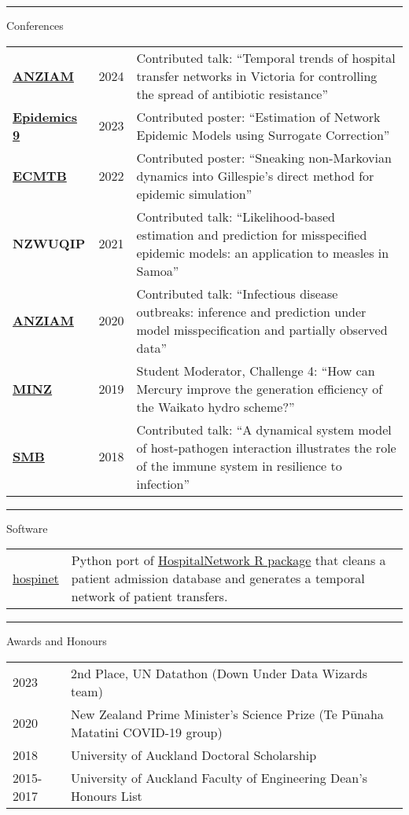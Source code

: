 \documentclass[paper=a4paper,fontsize=11pt]{scrartcl}
\newcommand{\pagerule}[1][2pt]{\noindent\rule{\textwidth}{#1}}
\newcommand{\usingfont}[2]{#1 #2 \par \normalsize \normalfont}
\newcommand{\sectionheader}[1]{\pagerule \vspace{0.05ex} \usingfont{\usefont{T1}{phv}{m}{v} \Large}{\noindent \hspace{-0.5em} #1} \vspace{0.75ex}}
\newlength{\spacebox}
\begin{document}
\sectionheader{Conferences}
\vspace{0.5ex}
\noindent 
\begin{tabular}{p{1.1\spacebox} p{0.5\spacebox} p{6.7\spacebox}}
\href{https://www.mathematics.org.au/sys/pages/plain.php?page\_id=39\&conf\_id=61}{\textbf{ANZIAM}} & 2024 & Contributed
talk: ``Temporal trends of hospital transfer networks in Victoria for
controlling the spread of antibiotic resistance'' \\
\href{https://www.elsevier.com/events/conferences/all/international-conference-on-infectious-disease-dynamics}{\textbf{Epidemics
9}} & 2023 & Contributed poster: ``Estimation of Network Epidemic Models
using Surrogate Correction'' \\
\href{https://ecmtb2022.org}{\textbf{ECMTB}} & 2022 & Contributed
poster: ``Sneaking non-Markovian dynamics into Gillespie's direct method
for epidemic simulation'' \\
\textbf{NZWUQIP} & 2021 & Contributed talk: ``Likelihood-based
estimation and prediction for misspecified epidemic models: an
application to measles in Samoa'' \\
\href{http://www.maths.mq.edu.au/ANZIAM2020}{\textbf{ANZIAM}} & 2020 & Contributed
talk: ``Infectious disease outbreaks: inference and prediction under
model misspecification and partially observed data'' \\
\href{https:/minz.org.nz/2019/}{\textbf{MINZ}} & 2019 & Student
Moderator, Challenge 4: ``How can Mercury improve the generation
efficiency of the Waikato hydro scheme?'' \\
\href{http://conferences.science.unsw.edu.au/SMB2018/}{\textbf{SMB}} & 2018 & Contributed
talk: ``A dynamical system model of host-pathogen interaction
illustrates the role of the immune system in resilience to
infection'' \\
\end{tabular}

\sectionheader{Software}
\vspace{0.5ex}\noindent
\begin{tabular}{p{1.6\spacebox} p{6.7\spacebox}}
\href{https://pypi.org/project/hospinet/}{hospinet} & Python port of
\href{https://cran.r-project.org/web//packages//HospitalNetwork/index.html}{HospitalNetwork
R package} that cleans a patient admission database and generates a
temporal network of patient transfers. \\
\end{tabular}

\sectionheader{Awards and Honours}
\vspace{0.5ex}\noindent
\begin{tabular}{p{1.0\spacebox} p{0.2\spacebox} p{6.5\spacebox}}
2023 & \multicolumn{2}{l}{2nd Place, UN Datathon (Down Under Data
Wizards team)} \\
2020 & \multicolumn{2}{l}{New Zealand Prime Minister's Science Prize (Te
Pūnaha Matatini COVID-19 group)} \\
2018 & \multicolumn{2}{l}{University of Auckland Doctoral
Scholarship} \\
2015-2017 & \multicolumn{2}{l}{University of Auckland Faculty of
Engineering Dean's Honours List} \\
\end{tabular}
\end{document}
